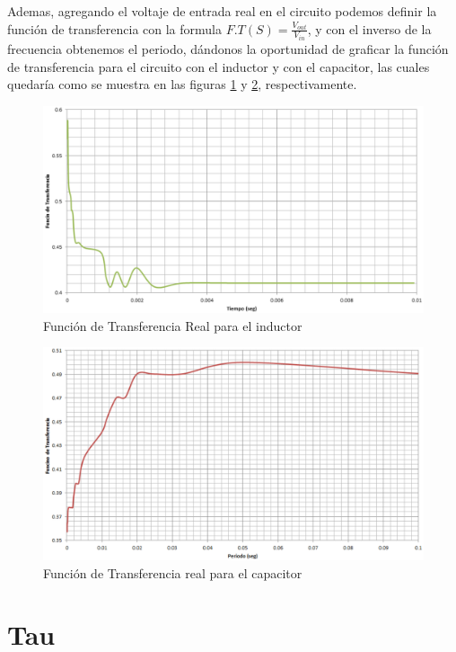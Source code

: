 \documentclass[letterpaper,spanish,12pt]{report}
\begin{document}
Ademas, agregando el voltaje de entrada real en el circuito podemos definir la funci\'on de transferencia con la formula $F.T(S) = \frac{V_{out}}{V_{in}}$, y con el inverso de la frecuencia obtenemos el periodo, d\'andonos la oportunidad de graficar la funci\'on de transferencia para el circuito con el inductor y con el capacitor, las cuales quedar\'ia como se muestra en las figuras \ref{cir:16} y \ref{cir:17}, respectivamente.

\begin{figure}[h]
	\centering
		\includegraphics[width=1.00\textwidth]{ResReaFunL.eps}
	\caption{Funci\'on de Transferencia Real para el inductor}
	\label{cir:16}
\end{figure}

\begin{figure}[h]
	\centering
		\includegraphics[width=1.00\textwidth]{ResReaFunC.eps}
	\caption{Funci\'on de Transferencia real para el capacitor}
	\label{cir:17}
\end{figure}

	\section{Tau}
\end{document}
